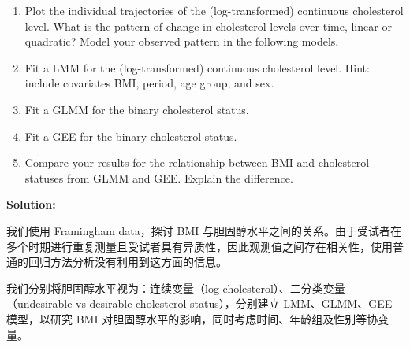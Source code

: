 \begin{enumerate}[label=(\alph*)]
  \item Plot the individual trajectories of the (log-transformed) continuous cholesterol level. What is the pattern of change in cholesterol levels over time, linear or quadratic? Model your observed pattern in the following models.
  \item Fit a LMM for the (log-transformed) continuous cholesterol level. Hint: include covariates BMI, period, age group, and sex.
  \item Fit a GLMM for the binary cholesterol status.
  \item Fit a GEE for the binary cholesterol status.
  \item Compare your results for the relationship between BMI and cholesterol statuses from GLMM and GEE. Explain the difference.
\end{enumerate}

\bigskip
\textbf{Solution:}

我们使用 Framingham data，探讨 BMI 与胆固醇水平之间的关系。由于受试者在多个时期进行重复测量且受试者具有异质性，因此观测值之间存在相关性，使用普通的回归方法分析没有利用到这方面的信息。

我们分别将胆固醇水平视为：连续变量（log-cholesterol）、二分类变量（undesirable vs desirable cholesterol status），分别建立 LMM、GLMM、GEE 模型，以研究 BMI 对胆固醇水平的影响，同时考虑时间、年龄组及性别等协变量。


